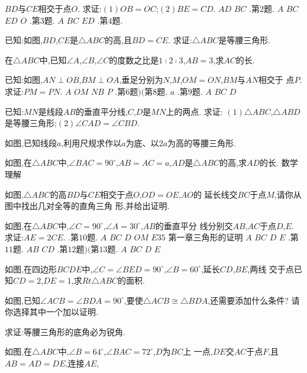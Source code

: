 \documentclass[cn,blue,12pt]{elegantbook}
\begin{document}
\begin{liti}[resume]
\(BD \)与\( CE \)相交于点\( O\). 求证:\( ( 1) OB = OC\);\( ( 2) BE = CD\). 
\(A D\)
\(B C\)
.第\( 2 \)题.
\(A\)
\(B C\)
\(E D\)
\(O\)
.第\( 3 \)题.
\(A\)
\(B C\)
\(E D\)
.第\( 4 \)题.
\item 已知:如图,\( BD\),\( CE \)是\( \triangle ABC \)的高,且\( BD = CE\). 求证:\( \triangle ABC \)是等腰三角形. 
\item 在\( \triangle ABC \)中,已知\( \angle  A\),\( \angle  B\),\( \angle  C \)的度数之比是\( 1∶ 2∶ 3\),\( AB = 3\),求\( AC \)的长. 
\item 已知:如图,\( AN \perp OB\),\( BM \perp OA\),垂足分别为\( N\),\( M\),\( OM = ON\),\( BM \)与\( AN \)相交于
点\( P\). 求证:\( PM = PN\). 
\(A\)
\(O M\)
\(N B\)
\(P\)
.第\( 6 \)题\() ( \)第\( 8 \)题.
\(a\)
.第\( 9 \)题.
\(A\)
\(B C\)
\(D\)
\item 已知:\( MN \)是线段\( AB \)的垂直平分线,\( C\),\( D \)是\( MN \)上的两点. 求证:
\(( 1) \triangle ABC\),\( \triangle ABD \)是等腰三角形;\( ( 2) \angle  CAD = \angle  CBD\). 
\item 如图,已知线段\( a\),利用尺规求作以\( a \)为底、以\( 2a \)为高的等腰三角形. 
\item 如图,在\( \triangle ABC \)中,\( \angle  BAC= 90 ^\circ \),\( AB = AC = a\),\( AD \)是\( \triangle ABC \)的高,求\( AD \)的长. 
数学理解
\item 如图,\( \triangle ABC \)的高\( BD \)与\( CE \)相交于点\( O\),\( OD = OE\),\( AO \)的
延长线交\( BC \)于点\( M\),请你从图中找出几对全等的直角三角
形,并给出证明. 
\item 如图,在\( \triangle ABC \)中,\( \angle C = 90 ^\circ \),\( \angle A = 30 ^\circ \),\( AB \)的垂直平分
线分别交\( AB\),\( AC \)于点\( D\),\( E\). 求证:\( AE = 2CE\). 
.第\( 10 \)题.
\(A\)
\(B C\)
\(D\)
\(O M\)
\(E35\)
第一章\(  \)三角形的证明
\(A\)
\(B C\)
\(D\)
\(E\)
.第\( 11 \)题.
\(A B\)
\(C D\)
.第\( 12 \)题\() ( \)第\( 13 \)题.
\(A\)
\(B C\)
\(D\)
\(E\)
\item 如图,在四边形\( BCDE \)中,\( \angle C = \angle BED = 90 ^\circ \),\( \angle B = 60 ^\circ \),延长\( CD\),\( BE\),两线
交于点\task 已知\( CD = 2\),\( DE = 1\),求\( Rt \triangle ABC \)的面积. 
\item 如图,已知\( \angle ACB = \angle BDA = 90 ^\circ \),要使\( \triangle ACB \cong  \triangle BDA\),还需要添加什么条件?
请你选择其中一个加以证明. 
\item 求证:等腰三角形的底角必为锐角. 
\item 如图,在\( \triangle ABC\)中,\( \angle B = 64 ^\circ \),\( \angle BAC = 72 ^\circ \),\( D \)为\( BC \)上
一点,\( DE \)交\( AC \)于点\( F\),且\( AB = AD = DE\),连接\( AE\),

\end{liti}
\end{document}
